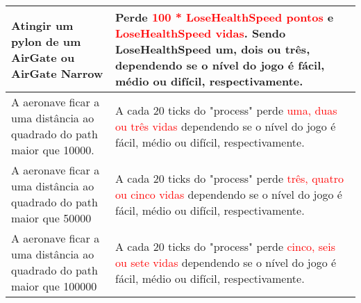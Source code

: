 \begin{table}[h]
\begin{tabular}{|p{}|p{}|}
\hline
\hspace{0.1cm}\vspace{0.1cm}Atingir um pylon de um AirGate ou AirGate Narrow & Perde \textcolor{red}{100 * LoseHealthSpeed pontos} e \textcolor{red}{LoseHealthSpeed vidas}. Sendo LoseHealthSpeed um, dois ou três, dependendo se o nível do jogo é fácil, médio ou difícil, respectivamente.\hspace{0.1cm}\vspace{0.1cm} \\
\hline
\hspace{0.1cm}\vspace{0.1cm}A aeronave ficar a uma distância ao quadrado do path maior que 10000. & A cada 20 ticks do "process" perde \textcolor{red}{uma, duas ou três vidas} dependendo se o nível do jogo é fácil, médio ou difícil, respectivamente.\hspace{0.1cm}\vspace{0.1cm} \\
\hline
\hspace{0.1cm}\vspace{0.1cm}A aeronave ficar a uma distância ao quadrado do path maior que 50000 & A cada 20 ticks do "process" perde \textcolor{red}{três, quatro ou cinco vidas} dependendo se o nível do jogo é fácil, médio ou difícil, respectivamente.\hspace{0.1cm}\vspace{0.1cm} \\
\hline
\hspace{0.1cm}\vspace{0.1cm}A aeronave ficar a uma distância ao quadrado do path maior que 100000 & A cada 20 ticks do "process" perde \textcolor{red}{cinco, seis ou sete vidas} dependendo se o nível do jogo é fácil, médio ou difícil, respectivamente.\hspace{0.1cm}\vspace{0.1cm} \\
\hline
\end{tabular}
\end{table}